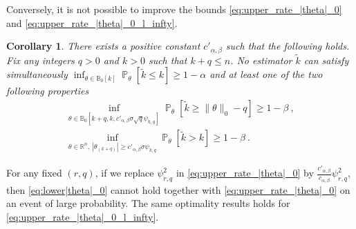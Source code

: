\documentclass[twoside,11pt]{article}
\newtheorem{cor}{Corollary}
\renewcommand{\P}{\operatorname{\mathbb{P}}}
\newcommand{\<}{\langle}
\renewcommand{\>}{\rangle}
\begin{document}
Conversely, it is not possible to improve the bounds \eqref{eq:upper_rate_|theta|_0} and \eqref{eq:upper_rate_|theta|_0_l_infty}. 


\begin{cor}\label{cor:rate_estimation_optimality}
 There exists a positive constant $c'_{\alpha,\beta}$  such that the following holds.
 Fix  any integers $q>0$ and $k>0$ such that $k+q\leq n$. No estimator $\tilde{k}$ can satisfy simultaneously $\inf_{\theta\in \mathbb{B}_0[k]}\P_{\theta}[\tilde{k}\leq k]\geq 1-\alpha$ and at least one of the two following properties
 \begin{eqnarray}\label{eq:1_negative}
 \inf_{\theta\in \mathbb{B}_0[k+q,k, c'_{\alpha,\beta}\sigma \sqrt{q} \psi_{k,q}]}
\P_{\theta}[\tilde{k}\geq \|\theta\|_0- q ]\geq 1-\beta\ ,\\  \label{eq:2_negative}
\inf_{\theta\in \mathbb{R}^n,\  |\theta_{(k+q)}|\geq c'_{\alpha,\beta}\sigma \psi_{k,q}}
\P_{\theta}[\tilde{k}>k ]\geq 1-\beta\ .
  \end{eqnarray}
\end{cor}
For any fixed $(r,q)$, if we replace $\psi^2_{r,q}$ in \eqref{eq:upper_rate_|theta|_0} by $\tfrac{c'_{\alpha,\beta}}{c_{\alpha,\beta}}\psi^2_{r,q}$, then \eqref{eq:lower|theta|_0} cannot hold together with \eqref{eq:upper_rate_|theta|_0} on an event of large probability. 
The same optimality results holds for \eqref{eq:upper_rate_|theta|_0_l_infty}.
\end{document}
